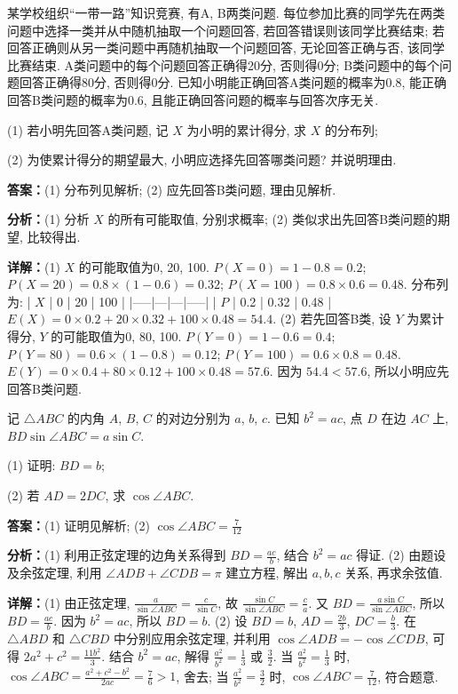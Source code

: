 \begin{question}[points=12]
某学校组织“一带一路”知识竞赛, 有A, B两类问题. 每位参加比赛的同学先在两类问题中选择一类并从中随机抽取一个问题回答, 若回答错误则该同学比赛结束; 若回答正确则从另一类问题中再随机抽取一个问题回答, 无论回答正确与否, 该同学比赛结束. A类问题中的每个问题回答正确得20分, 否则得0分; B类问题中的每个问题回答正确得80分, 否则得0分. 已知小明能正确回答A类问题的概率为0.8, 能正确回答B类问题的概率为0.6, 且能正确回答问题的概率与回答次序无关.

(1) 若小明先回答A类问题, 记 $X$ 为小明的累计得分, 求 $X$ 的分布列;

(2) 为使累计得分的期望最大, 小明应选择先回答哪类问题? 并说明理由.
\begin{solution}
\textbf{答案：}(1) 分布列见解析; (2) 应先回答B类问题, 理由见解析.

\textbf{分析：}(1) 分析 $X$ 的所有可能取值, 分别求概率; (2) 类似求出先回答B类问题的期望, 比较得出.

\textbf{详解：}(1) $X$ 的可能取值为0, 20, 100. $P(X=0) = 1-0.8 = 0.2$; $P(X=20) = 0.8 \times (1-0.6) = 0.32$; $P(X=100) = 0.8 \times 0.6 = 0.48$. 分布列为:
| $X$ | 0 | 20 | 100 |
|-----|---|---|-----|
| $P$ | 0.2 | 0.32 | 0.48 |
$E(X) = 0\times0.2 + 20\times0.32 + 100\times0.48 = 54.4$.
(2) 若先回答B类, 设 $Y$ 为累计得分, $Y$ 的可能取值为0, 80, 100. $P(Y=0) = 1-0.6 = 0.4$; $P(Y=80) = 0.6\times(1-0.8) = 0.12$; $P(Y=100) = 0.6\times0.8 = 0.48$. $E(Y) = 0\times0.4 + 80\times0.12 + 100\times0.48 = 57.6$. 因为 $54.4 < 57.6$, 所以小明应先回答B类问题.
\end{solution}
\end{question}

\begin{question}[points=12]
记 $\triangle ABC$ 的内角 $A$, $B$, $C$ 的对边分别为 $a$, $b$, $c$. 已知 $b^2 = ac$, 点 $D$ 在边 $AC$ 上, $BD \sin\angle ABC = a \sin C$.

(1) 证明: $BD = b$;

(2) 若 $AD = 2DC$, 求 $\cos\angle ABC$.
\begin{solution}
\textbf{答案：}(1) 证明见解析; (2) $\cos\angle ABC = \frac{7}{12}$

\textbf{分析：}(1) 利用正弦定理的边角关系得到 $BD = \frac{ac}{b}$, 结合 $b^2 = ac$ 得证. (2) 由题设及余弦定理, 利用 $\angle ADB + \angle CDB = \pi$ 建立方程, 解出 $a,b,c$ 关系, 再求余弦值.

\textbf{详解：}(1) 由正弦定理, $\frac{a}{\sin\angle ABC} = \frac{c}{\sin C}$, 故 $\frac{\sin C}{\sin\angle ABC} = \frac{c}{a}$. 又 $BD = \frac{a\sin C}{\sin\angle ABC}$, 所以 $BD = \frac{ac}{b}$. 因为 $b^2 = ac$, 所以 $BD = b$.
(2) 设 $BD = b$, $AD = \frac{2b}{3}$, $DC = \frac{b}{3}$. 在 $\triangle ABD$ 和 $\triangle CBD$ 中分别应用余弦定理, 并利用 $\cos\angle ADB = -\cos\angle CDB$, 可得 $2a^2 + c^2 = \frac{11b^2}{3}$. 结合 $b^2 = ac$, 解得 $\frac{a^2}{b^2} = \frac{1}{3}$ 或 $\frac{3}{2}$. 当 $\frac{a^2}{b^2} = \frac{1}{3}$ 时, $\cos\angle ABC = \frac{a^2 + c^2 - b^2}{2ac} = \frac{7}{6} > 1$, 舍去; 当 $\frac{a^2}{b^2} = \frac{3}{2}$ 时, $\cos\angle ABC = \frac{7}{12}$, 符合题意.
\end{solution}
\end{question}

